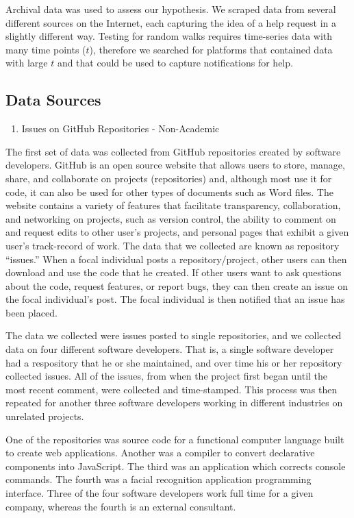\documentclass[english,,man]{apa6}
\providecommand{\tightlist}{%
  \setlength{\itemsep}{0pt}\setlength{\parskip}{0pt}}
\theoremstyle{definition}
\theoremstyle{definition}
\theoremstyle{definition}
\theoremstyle{remark}
\begin{document}
Archival data was used to assess our hypothesis. We scraped data from
several different sources on the Internet, each capturing the idea of a
help request in a slightly different way. Testing for random walks
requires time-series data with many time points (\(t\)), therefore we
searched for platforms that contained data with large \(t\) and that
could be used to capture notifications for help.

\hypertarget{data-sources}{%
\subsection{Data Sources}\label{data-sources}}

\begin{enumerate}
\def\labelenumi{(\arabic{enumi})}
\tightlist
\item
  Issues on GitHub Repositories - Non-Academic
\end{enumerate}

The first set of data was collected from GitHub repositories created by
software developers. GitHub is an open source website that allows users
to store, manage, share, and collaborate on projects (repositories) and,
although most use it for code, it can also be used for other types of
documents such as Word files. The website contains a variety of features
that facilitate transparency, collaboration, and networking on projects,
such as version control, the ability to comment on and request edits to
other user's projects, and personal pages that exhibit a given user's
track-record of work. The data that we collected are known as repository
\enquote{issues.} When a focal individual posts a repository/project,
other users can then download and use the code that he created. If other
users want to ask questions about the code, request features, or report
bugs, they can then create an issue on the focal individual's post. The
focal individual is then notified that an issue has been placed.

The data we collected were issues posted to single repositories, and we
collected data on four different software developers. That is, a single
software developer had a respository that he or she maintained, and over
time his or her repository collected issues. All of the issues, from
when the project first began until the most recent comment, were
collected and time-stamped. This process was then repeated for another
three software developers working in different industries on unrelated
projects.

One of the repositories was source code for a functional computer
language built to create web applications. Another was a compiler to
convert declarative components into JavaScript. The third was an
application which corrects console commands. The fourth was a facial
recognition application programming interface. Three of the four
software developers work full time for a given company, whereas the
fourth is an external consultant.
\end{document}
